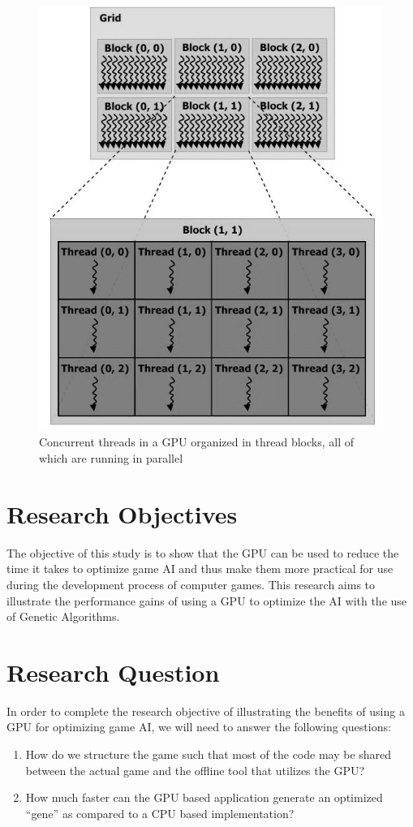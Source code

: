 \begin{figure}
	\centering
		\graphicspath{{images/}}
		\includegraphics[width=190 pt]{gpu.jpg}
	\caption{Concurrent threads in a GPU organized in thread blocks, all of which
are running in parallel
	\cite{pdf:NVCudaPrgGuide}}
	\label{fig:gpu_diagram}
\end{figure}

\section{Research Objectives}

The objective of this study is to show that the GPU can be used to reduce the time
it takes to optimize game AI and thus make them more practical for use during the
development process of computer games. This research aims to illustrate the
performance gains of using a GPU to optimize the AI with the use of Genetic Algorithms.


\section{Research Question}

In order to complete the research objective of illustrating the benefits of using
a GPU for optimizing game AI, we will need to answer the following questions:

\begin{enumerate}
 \item How do we structure the game such that most of the code may be shared between
the actual game and the offline tool that utilizes the GPU?

 \item How much faster can the GPU based application generate an optimized ``gene''
as compared to a CPU based implementation?
\end{enumerate}

